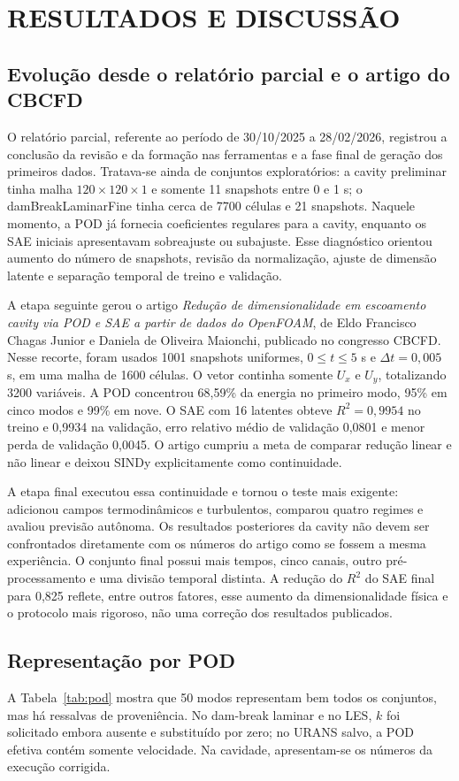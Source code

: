\documentclass[12pt,a4paper]{article}
\newcommand{\novasecao}[1]{\clearpage\section{#1}}
\begin{document}
\novasecao{RESULTADOS E DISCUSSÃO}
\subsection{Evolução desde o relatório parcial e o artigo do CBCFD}
O relatório parcial, referente ao período de 30/10/2025 a 28/02/2026, registrou a conclusão da revisão e da formação nas ferramentas e a fase final de geração dos primeiros dados. Tratava-se ainda de conjuntos exploratórios: a cavity preliminar tinha malha $120\times120\times1$ e somente 11 snapshots entre 0 e 1 s; o damBreakLaminarFine tinha cerca de 7700 células e 21 snapshots. Naquele momento, a POD já fornecia coeficientes regulares para a cavity, enquanto os SAE iniciais apresentavam sobreajuste ou subajuste. Esse diagnóstico orientou aumento do número de snapshots, revisão da normalização, ajuste de dimensão latente e separação temporal de treino e validação.

A etapa seguinte gerou o artigo \textit{Redução de dimensionalidade em escoamento cavity via POD e SAE a partir de dados do OpenFOAM}, de Eldo Francisco Chagas Junior e Daniela de Oliveira Maionchi, publicado no congresso CBCFD. Nesse recorte, foram usados 1001 snapshots uniformes, $0\leq t\leq5$ s e $\Delta t=0,005$ s, em uma malha de 1600 células. O vetor continha somente $U_x$ e $U_y$, totalizando 3200 variáveis. A POD concentrou 68,59\% da energia no primeiro modo, 95\% em cinco modos e 99\% em nove. O SAE com 16 latentes obteve $R^2=0,9954$ no treino e 0,9934 na validação, erro relativo médio de validação 0,0801 e menor perda de validação 0,0045. O artigo cumpriu a meta de comparar redução linear e não linear e deixou SINDy explicitamente como continuidade.

A etapa final executou essa continuidade e tornou o teste mais exigente: adicionou campos termodinâmicos e turbulentos, comparou quatro regimes e avaliou previsão autônoma. Os resultados posteriores da cavity não devem ser confrontados diretamente com os números do artigo como se fossem a mesma experiência. O conjunto final possui mais tempos, cinco canais, outro pré-processamento e uma divisão temporal distinta. A redução do $R^2$ do SAE final para 0,825 reflete, entre outros fatores, esse aumento da dimensionalidade física e o protocolo mais rigoroso, não uma correção dos resultados publicados.

\subsection{Representação por POD}
A Tabela~\ref{tab:pod} mostra que 50 modos representam bem todos os conjuntos, mas há ressalvas de proveniência. No dam-break laminar e no LES, $k$ foi solicitado embora ausente e substituído por zero; no URANS salvo, a POD efetiva contém somente velocidade. Na cavidade, apresentam-se os números da execução corrigida.
\end{document}
